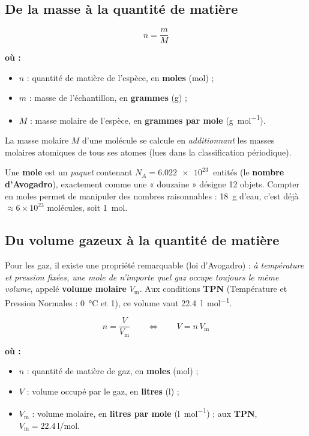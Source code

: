 \documentclass[11pt,a4paper]{article}
\newenvironment{ou}{%
  \par\smallskip\noindent\textbf{où :}\nopagebreak
  \begin{itemize}[leftmargin=1.8em,topsep=2pt,itemsep=1.5pt,parsep=0pt]}%
  {\end{itemize}}
\newcommand{\gmol}{\si{\gram\per\mole}}
\newcommand{\Lmol}{\si{\litre\per\mole}}
\newcommand{\Vm}{V_{\mathrm{m}}}          %
\begin{document}
\subsection{De la masse à la quantité de matière}

\begin{formule}
\[
\boxed{\;n=\dfrac{m}{M}\;}
\]
\begin{ou}
  \item $n$ : quantité de matière de l'espèce, en \textbf{moles} (\si{\mole}) ;
  \item $m$ : masse de l'échantillon, en \textbf{grammes} (\si{\gram}) ;
  \item $M$ : masse molaire de l'espèce, en \textbf{grammes par mole} (\gmol).
\end{ou}
La masse molaire $M$ d'une molécule se calcule en \emph{additionnant} les masses molaires atomiques
de tous ses atomes (lues dans la classification périodique).
\end{formule}

\begin{remarque}
Une \textbf{mole} est un \emph{paquet} contenant $N_A=\SI{6,022e23}{}$ entités (le \textbf{nombre
d'Avogadro}), exactement comme une « douzaine » désigne 12 objets. Compter en moles permet de
manipuler des nombres raisonnables : \SI{18}{\gram} d'eau, c'est déjà $\approx6\times10^{23}$
molécules, soit \SI{1}{\mole}.
\end{remarque}

\subsection{Du volume gazeux à la quantité de matière}

Pour les gaz, il existe une propriété remarquable (loi d'Avogadro) : \emph{à température et pression
fixées, une mole de n'importe quel gaz occupe toujours le même volume}, appelé \textbf{volume
molaire} $\Vm$. Aux conditions \textbf{TPN} (Température et Pression Normales : \SI{0}{\celsius} et
\SI{1}{\atm}), ce volume vaut \SI{22,4}{\litre\per\mole}.

\begin{formule}
\[
\boxed{\;n=\dfrac{V}{\Vm}\qquad\Longleftrightarrow\qquad V=n\,\Vm\;}
\]
\begin{ou}
  \item $n$ : quantité de matière de gaz, en \textbf{moles} (\si{\mole}) ;
  \item $V$ : volume occupé par le gaz, en \textbf{litres} (\si{\litre}) ;
  \item $\Vm$ : volume molaire, en \textbf{litres par mole} (\Lmol) ; aux \textbf{TPN},
        $\Vm=\SI{22,4}{\litre\per\mole}$.
\end{ou}
\end{formule}
\end{document}
